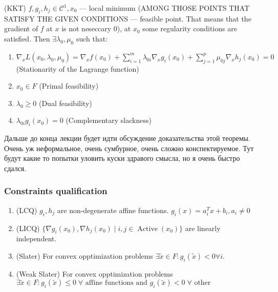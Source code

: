 \begin{theorem} (KKT)
    $f, g_i, h_j \in \mathcal{C}^1, x_0$ --- local minimum (AMONG THOSE POINTS THAT SATISFY THE GIVEN CONDITIONS --- feasible point. That means that the gradient of $f$ at $x$ is not neseccary 0), at $x_0$ some regularity conditions are satisfied. Then $\exists \lambda_0, \mu_0$ such that:
    \begin{enumerate}
        \item $\nabla_x L(x_0, \lambda_0, \mu_0) = \nabla_x f(x_0) + \sum_{i=1}^m \lambda_{0i} \nabla_x g_i(x_0) + \sum_{j=1}^p \mu_{0j} \nabla_x h_j(x_0) = 0$ (Stationarity of the Lagrange function)
        \item $x_0 \in F$ (Primal feasibility)
        \item $\lambda_0 \geq 0$ (Dual feasibility)
        \item $\lambda_{0i} g_i(x_0) = 0$ (Complementary slackness)
    \end{enumerate}
\end{theorem}

Дальше до конца лекции будет идти обсуждение доказательства этой теоремы. Очень уж неформальное, очень сумбурное, очень сложно конспектируемое. Тут будут какие то попытки уловить куски здравого смысла, но я очень быстро сдался.

\subsubsection{Constraints qualification}
\begin{enumerate}
    \item (LCQ) $g_i, h_j$ are non-degenerate affine functions. $g_i(x) = a^T_i x + b_i, a_i \neq 0$
    \item (LICQ) $\{ \nabla g_i(x_0), \nabla h_j(x_0) \mid i, j \in \operatorname{Active}(x_0) \}$ are linearly independent.
    \item (Slater) For convex opptimization problems $\exists \tilde{x} \in F : g_i(\tilde{x}) < 0 \forall i$.
    \item (Weak Slater) For convex opptimization problems $\exists \tilde{x} \in F : g_i(\tilde{x}) \leq 0 \; \forall \text{ affine functions and } g_i(\tilde{x}) < 0 \;  \forall \text{ other}$ 
\end{enumerate}

